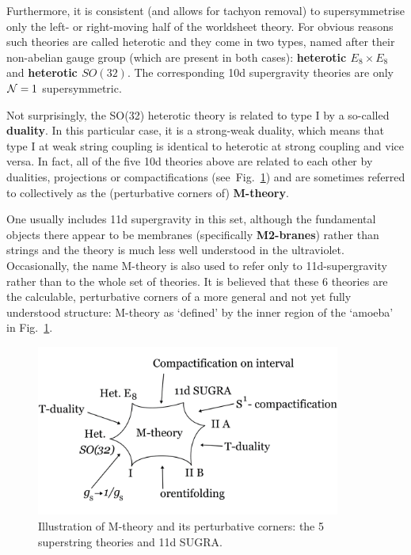 \documentclass[12pt]{article}
\numberwithin{equation}{section}
\begin{document}
Furthermore, it is consistent (and allows for tachyon removal) to supersymmetrise only the left- or right-moving half of the worldsheet theory. For obvious reasons such theories are called heterotic and they come in two types, named after their non-abelian gauge group (which are present in both cases): {\bf heterotic $E_8\times E_8$} and {\bf heterotic $SO(32)$}. The corresponding 10d supergravity theories are only ${\cal N}=1$ supersymmetric.

Not surprisingly, the SO(32) heterotic theory is related to type I by a so-called {\bf duality}. In this particular case, it is a strong-weak duality, which means that type I at weak string coupling is identical to heterotic at strong coupling and vice versa. In fact, all of the five 10d theories above are related to each other by dualities, projections or compactifications (see~Fig.~\ref{mth}) and are sometimes referred to collectively as the (perturbative corners of) {\bf M-theory}.

One usually includes 11d supergravity in this set, although the fundamental objects there appear to be membranes (specifically {\bf M2-branes}) rather than strings and the theory is much less well understood in the ultraviolet. Occasionally, the name M-theory is also used to refer only to 11d-supergravity rather than to the whole set of theories. It is believed that these 6 theories are the calculable, perturbative corners of a more general and not yet fully understood structure: M-theory as `defined' by the inner region of the `amoeba' in Fig.~\ref{mth}. 

\begin{figure}[ht]
\begin{center} 
\includegraphics[width=10cm]{mth.png}
\caption{Illustration of M-theory and its perturbative corners: the 5 superstring theories and 11d SUGRA.}
\label{mth} 
\end{center}
\end{figure}
\end{document}
